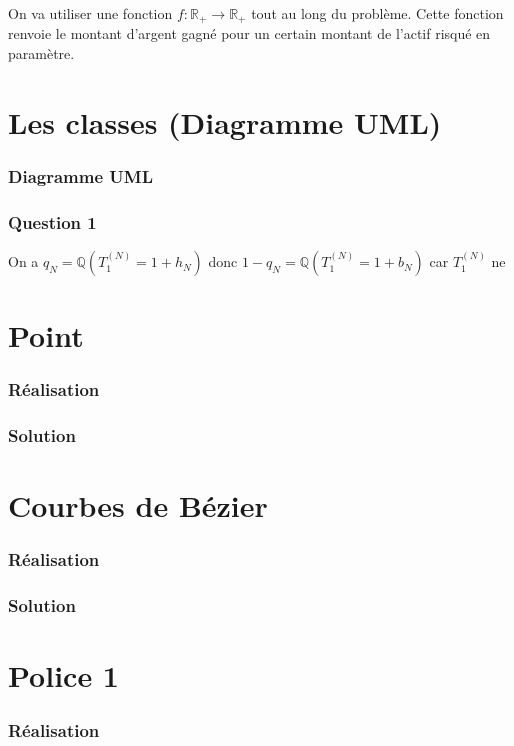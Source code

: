 \documentclass[a4paper, 12pt]{article}
\begin{document}
	On va utiliser une fonction $f:  \mathbb{R}_+ \rightarrow \mathbb{R}_+$ tout au long du problème. Cette fonction renvoie le montant d'argent gagné pour un certain montant de l'actif risqué en paramètre.\\
		
	\newpage

\section{Les classes (Diagramme UML)}			
\subsubsection{Diagramme UML}

\subsubsection{Question 1}
On a $q_N=\mathbb{Q}(T_1^{(N)}=1+h_N)$ donc $1-q_N=\mathbb{Q}(T_1^{(N)}=1+b_N)$ car $T_1^{(N)}$ ne 

\section{Point}	
\subsubsection{Réalisation}
\subsubsection{Solution}

\section{Courbes de Bézier}	
\subsubsection{Réalisation}
\subsubsection{Solution}


\section{Police 1}	
\subsubsection{Réalisation}
\end{document}
